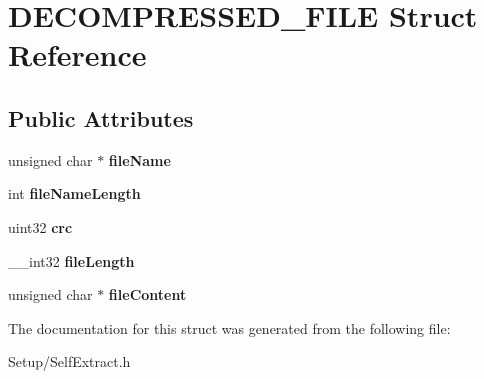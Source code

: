 \hypertarget{struct_d_e_c_o_m_p_r_e_s_s_e_d___f_i_l_e}{}\section{D\+E\+C\+O\+M\+P\+R\+E\+S\+S\+E\+D\+\_\+\+F\+I\+LE Struct Reference}
\label{struct_d_e_c_o_m_p_r_e_s_s_e_d___f_i_l_e}
\subsection*{Public Attributes}
\begin{DoxyCompactItemize}
\item 
\mbox{\label{struct_d_e_c_o_m_p_r_e_s_s_e_d___f_i_l_e_a8219902c0081c97f5370edee2f1a0545}} 
unsigned char $\ast$ {\bfseries file\+Name}
\item 
\mbox{\label{struct_d_e_c_o_m_p_r_e_s_s_e_d___f_i_l_e_a277183a315eea430ba43eec1368da8bd}} 
int {\bfseries file\+Name\+Length}
\item 
\mbox{\label{struct_d_e_c_o_m_p_r_e_s_s_e_d___f_i_l_e_ac444ec43b95736ce4d653c8cca500248}} 
uint32 {\bfseries crc}
\item 
\mbox{\label{struct_d_e_c_o_m_p_r_e_s_s_e_d___f_i_l_e_a1313bd6a2fea0629bf1f3b8bfb28a907}} 
\+\_\+\+\_\+int32 {\bfseries file\+Length}
\item 
\mbox{\label{struct_d_e_c_o_m_p_r_e_s_s_e_d___f_i_l_e_a5a27efbb3cbd6ff97fe6bede08305a68}} 
unsigned char $\ast$ {\bfseries file\+Content}
\end{DoxyCompactItemize}


The documentation for this struct was generated from the following file\+:\begin{DoxyCompactItemize}
\item 
Setup/Self\+Extract.\+h\end{DoxyCompactItemize}
